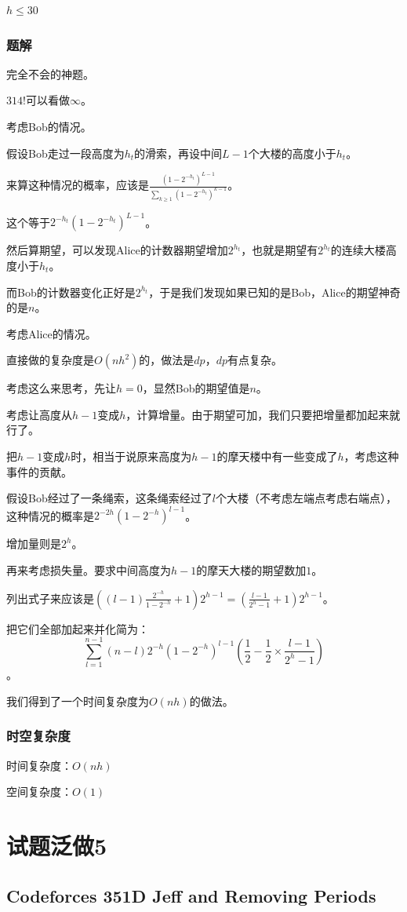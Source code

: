 \documentclass{ctexart}
\begin{document}
$h \le 30$
\subsubsection{题解}
完全不会的神题。

$314!$可以看做$\infty$。

考虑Bob的情况。

假设Bob走过一段高度为$h_t$的滑索，再设中间$L-1$个大楼的高度小于$h_t$。

来算这种情况的概率，应该是$\frac{(1-2^{-h_t})^{L-1}}{\sum_{k \ge 1} (1-2^{-h_t})^{k-1}}$。

这个等于$2^{-h_t}(1-2^{-h_t})^{L-1}$。

然后算期望，可以发现Alice的计数器期望增加$2^{h_t}$，也就是期望有$2^{h_t}$的连续大楼高度小于$h_t$。

而Bob的计数器变化正好是$2^{h_t}$，于是我们发现如果已知的是Bob，Alice的期望神奇的是$n$。

考虑Alice的情况。

直接做的复杂度是$O(nh^2)$的，做法是$dp$，$dp$有点复杂。

考虑这么来思考，先让$h=0$，显然Bob的期望值是$n$。

考虑让高度从$h-1$变成$h$，计算增量。由于期望可加，我们只要把增量都加起来就行了。

把$h-1$变成$h$时，相当于说原来高度为$h-1$的摩天楼中有一些变成了$h$，考虑这种事件的贡献。

假设Bob经过了一条绳索，这条绳索经过了$l$个大楼（不考虑左端点考虑右端点），这种情况的概率是$2^{-2h}(1-2^{-h})^{l-1}$。

增加量则是$2^h$。

再来考虑损失量。要求中间高度为$h-1$的摩天大楼的期望数加$1$。

列出式子来应该是$((l-1)\frac{2^{-h}}{1-2^{-h}}+1)2^{h-1}=(\frac{l-1}{2^h-1}+1)2^{h-1}$。

把它们全部加起来并化简为：\[\sum_{l=1}^{n-1} (n-l)2^{-h}(1-2^{-h})^{l-1}(\frac{1}{2}-\frac{1}{2} \times \frac{l-1}{2^h-1})\]。

我们得到了一个时间复杂度为$O(nh)$的做法。
\subsubsection{时空复杂度}
时间复杂度：$O(nh)$

空间复杂度：$O(1)$
\newpage
\section{试题泛做5}
\subsection{Codeforces 351D Jeff and Removing Periods}
\end{document}
